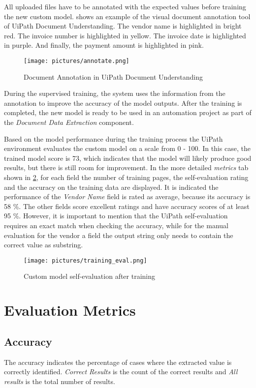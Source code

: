 All uploaded files have to be annotated with the expected values before training the new custom model.
 shows an example of the visual document annotation tool of UiPath Document Understanding. The vendor name is highlighted in bright red. The invoice number is highlighted in yellow. The invoice date is highlighted in purple. And finally, the payment amount is highlighted in pink.

\begin{figure}[ht]
    \centering
    \texttt{[image: pictures/annotate.png]}
    \caption{Document Annotation in UiPath Document Understanding}
    \label{fig:annotate}
\end{figure}

During the supervised training, the system uses the information from the annotation to improve the accuracy of the model outputs. After the training is completed, the new model is ready to be used in an automation project as part of the \textit{Document Data Extraction} component. 

Based on the model performance during the training process the UiPath environment evaluates the custom model on a scale from 0 - 100. In this case, the trained model score is 73, which indicates that the model will likely produce good results, but there is still room for improvement. In the more detailed \textit{metrics} tab shown in \cref{fig:train-eval}, for each field the number of training pages, the self-evaluation rating and the accuracy on the training data are displayed. 
It is indicated the performance of the \textit{Vendor Name} field is rated as average, because its accuracy is 58 \%. The other fields score excellent ratings and have accuracy scores of at least 95 \%. However, it is important to mention that the UiPath self-evaluation requires an exact match when checking the accuracy, while for the manual evaluation for the vendor a field the output string only needs to contain the correct value as substring.

\begin{figure}[ht]
    \centering
    \texttt{[image: pictures/training\_eval.png]}
    \caption{Custom model self-evaluation after training}
    \label{fig:train-eval}
\end{figure}

\newpage
\section{Evaluation Metrics}
\subsection{Accuracy}
The accuracy indicates the percentage of cases where the extracted value is correctly identified. \textit{Correct Results} is the count of the correct results and \textit{All results} is the total number of results.

